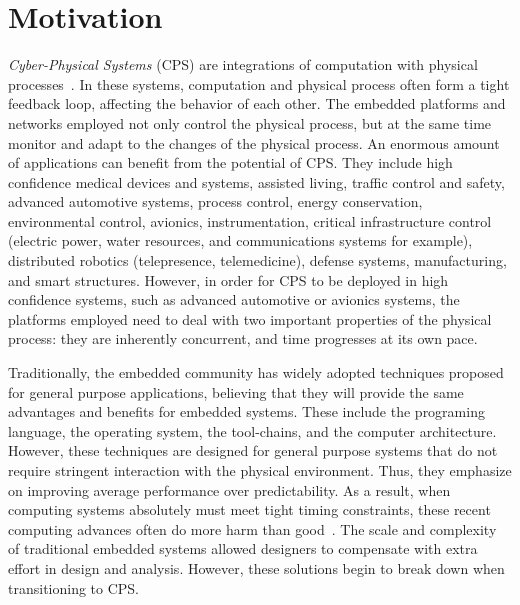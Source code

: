 \section{Motivation}
\emph{Cyber-Physical Systems} (CPS) are integrations of computation with physical processes~.
In these systems, computation and physical process often form a tight feedback loop, affecting the behavior of each other.
The embedded platforms and networks employed not only control the physical process, but at the same time monitor and adapt to the changes of the physical process.
An enormous amount of applications can benefit from the potential of CPS.
They include high confidence medical devices and systems, assisted living, traffic control and safety, advanced automotive systems, process control, energy conservation, environmental control, avionics, instrumentation, critical infrastructure control (electric power, water resources, and communications systems for example), distributed robotics (telepresence, telemedicine), defense systems, manufacturing, and smart structures.
However, in order for CPS to be deployed in high confidence systems, such as advanced automotive or avionics systems, the platforms employed need to deal with two important properties of the physical process: they are inherently concurrent, and time progresses at its own pace.
 

Traditionally, the embedded community has widely adopted techniques proposed for general purpose applications, believing that they will provide the same
advantages and benefits for embedded systems.
These include the programing language, the operating system, the tool-chains, and the computer architecture.
However, these techniques are designed for general purpose systems that do not require stringent interaction with the physical environment. 
Thus, they emphasize on improving average performance over predictability.   
As a result, when computing systems absolutely must meet tight timing constraints, these recent computing advances often do more harm than good~\cite{LeeOnTime2005}.
The scale and complexity of traditional embedded systems allowed designers to compensate with extra effort in design and analysis. 
However, these solutions begin to break down when transitioning to CPS.   

